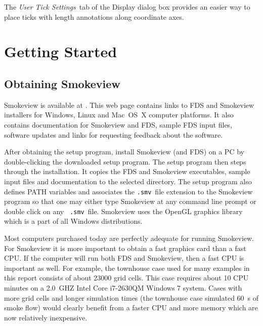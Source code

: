 \documentclass[11pt,twoside]{book}
\begin{document}
The {\em User Tick Settings}\ tab of the Display dialog box
provides an easier way to place ticks with length annotations
along coordinate axes.



\section{Getting Started}

\subsection{Obtaining Smokeview}

Smokeview is available at .
This web page contains links to FDS and Smokeview installers for
Windows, Linux and Mac~OS~X computer platforms. It also contains documentation for
Smokeview and FDS, sample FDS input files, software updates and
links for requesting feedback about the software.

After obtaining the setup program, install Smokeview (and FDS)  on a PC by
double-clicking the downloaded
setup program. The setup program then steps through the
installation. It copies the FDS and Smokeview executables,
sample input files and documentation to the selected directory.  The setup program also
defines PATH variables and associates the {\tt .smv}\ file
extension to the Smokeview program so that one may either type
Smokeview at any command line prompt or double click on any {\tt
.smv}\ file. Smokeview uses the OpenGL graphics library which is a
part of all Windows distributions.

Most computers purchased today are perfectly adequate for running
Smokeview. For Smokeview it is more important to obtain a fast
graphics card than a fast CPU. If the computer will run both FDS
and Smokeview, then a fast CPU is important as well.
For example, the townhouse case used for many examples in this
report consists of about 23000 grid cells.  This case requires
about 10 CPU minutes on a 2.0~GHZ Intel Core i7-2630QM Windows 7
system. Cases with more grid cells and longer simulation times
(the townhouse case simulated 60~s of smoke flow) would clearly
benefit from a faster CPU and more memory which are now relatively
inexpensive.
\end{document}
